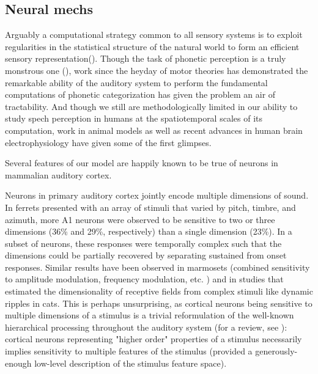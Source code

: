 
\subsection{Neural mechs}

Arguably a computational strategy common to all sensory systems is to exploit regularities in the statistical structure of the natural world to form an efficient sensory representation\cite{kuhlBrainMechanismsEarly2010,kingRecentAdvancesUnderstanding2018a,smithEfficientAuditoryCoding2006a,stilpRapidEfficientCoding2010,schiavoCapacitiesNeuralMechanisms2019}(). Though the task of phonetic perception is a truly monstrous one (), work since the heyday of motor theories has demonstrated the remarkable ability of the auditory system to perform the fundamental computations of phonetic categorization has given the problem an air of tractability. And though we still are methodologically limited in our ability to study spech perception in humans at the spatiotemporal scales of its computation, work in animal models as well as recent advances in human brain electrophysiology have given some of the first glimpses. 

Several features of our model are happily known to be true of neurons in mammalian auditory cortex. 

Neurons in primary auditory cortex jointly encode multiple dimensions of sound\cite{kingRecentAdvancesUnderstanding2018a}. In ferrets presented with an array of stimuli that varied by pitch, timbre, and azimuth\cite{bizleyInterdependentEncodingPitch2009b}, more A1 neurons were observed to be sensitive to two or three dimensions (36\% and 29\%, respectively) than a single dimension (23\%). In a subset of neurons, these responses were temporally complex such that the dimensions could be partially recovered by separating sustained from onset responses\cite{walkerMultiplexedRobustRepresentations2011}. Similar results have been observed in marmosets (combined sensitivity to amplitude modulation, frequency modulation, etc. \cite{Wang2005a}) and in studies that estimated the dimensionality of receptive fields from complex stimuli like dynamic ripples in cats\cite{atencioMultidimensionalReceptiveField2017}. This is perhaps unsurprising, as cortical neurons being sensitive to multiple dimensions of a stimulus is a trivial reformulation of the well-known hierarchical processing throughout the auditory system (for a review, see \cite{sharpeeHierarchicalRepresentationsAuditory2011b}): cortical neurons representing "higher order" properties of a stimulus necessarily implies sensitivity to multiple features of the stimulus (provided a generously-enough low-level description of the stimulus feature space).

